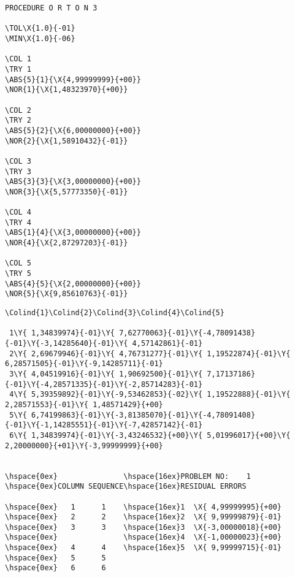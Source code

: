 

\small%
\begin{Verbatim}[commandchars=\\\{\},codes={\catcode`$=3\catcode`_=8}]
PROCEDURE O R T O N 3

\TOL\X{1.0}{-01}
\MIN\X{1.0}{-06}

\COL 1
\TRY 1
\ABS{5}{1}{\X{4,99999999}{+00}}
\NOR{1}{\X{1,48323970}{+00}}

\COL 2
\TRY 2
\ABS{5}{2}{\X{6,00000000}{+00}}
\NOR{2}{\X{1,58910432}{-01}}

\COL 3
\TRY 3
\ABS{3}{3}{\X{3,00000000}{+00}}
\NOR{3}{\X{5,57773350}{-01}}

\COL 4
\TRY 4
\ABS{1}{4}{\X{3,00000000}{+00}}
\NOR{4}{\X{2,87297203}{-01}}

\COL 5
\TRY 5
\ABS{4}{5}{\X{2,00000000}{+00}}
\NOR{5}{\X{9,85610763}{-01}}
\end{Verbatim}
%

\begin{landscape}
\begin{Verbatim}[commandchars=\\\{\},codes={\catcode`$=3\catcode`_=8}]
  \Colind{1}\Colind{2}\Colind{3}\Colind{4}\Colind{5}

 1\Y{ 1,34839974}{-01}\Y{ 7,62770063}{-01}\Y{-4,78091438}{-01}\Y{-3,14285640}{-01}\Y{ 4,57142861}{-01}
 2\Y{ 2,69679946}{-01}\Y{ 4,76731277}{-01}\Y{ 1,19522874}{-01}\Y{ 6,28571505}{-01}\Y{-9,14285711}{-01}
 3\Y{ 4,04519916}{-01}\Y{ 1,90692500}{-01}\Y{ 7,17137186}{-01}\Y{-4,28571335}{-01}\Y{-2,85714283}{-01}
 4\Y{ 5,39359892}{-01}\Y{-9,53462853}{-02}\Y{ 1,19522888}{-01}\Y{ 2,28571553}{-01}\Y{ 1,48571429}{+00}
 5\Y{ 6,74199863}{-01}\Y{-3,81385070}{-01}\Y{-4,78091408}{-01}\Y{-1,14285551}{-01}\Y{-7,42857142}{-01}
 6\Y{ 1,34839974}{-01}\Y{-3,43246532}{+00}\Y{ 5,01996017}{+00}\Y{ 2,20000000}{+01}\Y{-3,99999999}{+00}


\hspace{0ex}               \hspace{16ex}PROBLEM NO:    1
\hspace{0ex}COLUMN SEQUENCE\hspace{16ex}RESIDUAL ERRORS

\hspace{0ex}   1      1    \hspace{16ex}1  \X{ 4,99999995}{+00}
\hspace{0ex}   2      2    \hspace{16ex}2  \X{ 9,99999879}{-01}
\hspace{0ex}   3      3    \hspace{16ex}3  \X{-3,00000018}{+00}
\hspace{0ex}               \hspace{16ex}4  \X{-1,00000023}{+00}
\hspace{0ex}   4      4    \hspace{16ex}5  \X{ 9,99999715}{-01}
\hspace{0ex}   5      5
\hspace{0ex}   6      6
\end{Verbatim}


\end{landscape}
